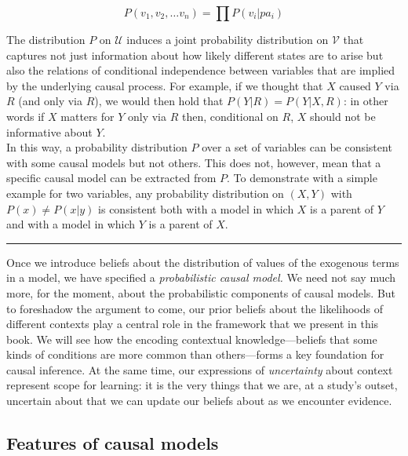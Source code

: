 \documentclass[12pt,]{book}
\begin{document}
\begin{equation} 
P(v_1,v_2,\dots v_n) = \prod P(v_i|pa_i)
\label{eq:markov}
\end{equation}

The distribution \(P\) on \(\mathcal{U}\) induces a joint probability distribution on \(\mathcal{V}\) that captures not just information about how likely different states are to arise but also the relations of conditional independence between variables that are implied by the underlying causal process. For example, if we thought that \(X\) caused \(Y\) via \(R\) (and only via \(R\)), we would then hold that \(P(Y | R) = P(Y | X, R)\): in other words if \(X\) matters for \(Y\) only via \(R\) then, conditional on \(R\), \(X\) should not be informative about \(Y\).\\
In this way, a probability distribution \(P\) over a set of variables can be consistent with some causal models but not others. This does not, however, mean that a specific causal model can be extracted from \(P\). To demonstrate with a simple example for two variables, any probability distribution on \((X,Y)\) with \(P(x)\neq P(x|y)\) is consistent both with a model in which \(X\) is a parent of \(Y\) and with a model in which \(Y\) is a parent of \(X\).

\begin{center}\rule{0.5\linewidth}{\linethickness}\end{center}

Once we introduce beliefs about the distribution of values of the exogenous terms in a model, we have specified a \emph{probabilistic causal model.} We need not say much more, for the moment, about the probabilistic components of causal models. But to foreshadow the argument to come, our prior beliefs about the likelihoods of different contexts play a central role in the framework that we present in this book. We will see how the encoding contextual knowledge---beliefs that some kinds of conditions are more common than others---forms a key foundation for causal inference. At the same time, our expressions of \emph{uncertainty} about context represent scope for learning: it is the very things that we are, at a study's outset, uncertain about that we can update our beliefs about as we encounter evidence.

\hypertarget{features-of-causal-models}{%
\subsection{Features of causal models}\label{features-of-causal-models}}
\end{document}
